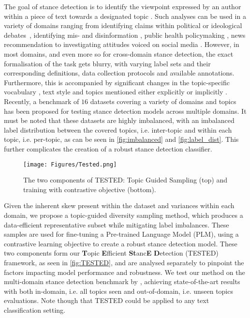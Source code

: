 \documentclass[11pt]{article}
\begin{document}
The goal of stance detection is to identify the viewpoint expressed by an author within a piece of text towards a designated topic \citep{mohammad2016semeval}. Such analyses can be used in a variety of domains ranging from identifying claims within political or ideological debates~\citep{somasundaran2010recognizing, thomas2006get}, identifying mis- and disinformation \citep{hanselowski2018retrospective,hardalov2021survey}, public health policymaking \citep{glandt2021stance,hossain2020covidlies, osnabrugge2023cross}, news recommendation \citep{reuver2021no} to investigating attitudes voiced on social media  \citep{qazvinian2011rumor,augenstein-etal-2016-stance,conforti2020will}. However, in most domains, and even more so for cross-domain stance detection, the exact formalisation of the task gets blurry, with varying label sets and their corresponding definitions, data collection protocols and available annotations. Furthermore, this is accompanied by significant changes in the topic-specific vocabulary \citep{somasundaran2010recognizing,wei2019modeling}, text style \citep{pomerleau2017fake, ferreira2016emergent} and topics mentioned either explicitly \citep{qazvinian2011rumor, walker2012corpus} or implicitly \citep{hasan2013stance,gorrell2019semeval}. Recently, a benchmark of $16$ datasets \citep{hardalov2021cross} covering a variety of domains and topics has been proposed for testing stance detection models across multiple domains. It must be noted that these datasets are highly imbalanced, with an imbalanced label distribution between the covered topics, i.e. inter-topic and within each topic, i.e. per-topic, as can be seen in \autoref{fig:imbalanced} and \autoref{fig:label_dist}. This further complicates the creation of a robust stance detection classifier.

\begin{figure}[t]
\centering
\texttt{[image: Figures/Tested.png]}
\caption{The two components of TESTED: Topic Guided Sampling (top) and training with contrastive objective (bottom).}
\label{fig:TESTED}
\end{figure}







Given the inherent skew present within the dataset and variances within each domain, we propose a topic-guided diversity sampling method, which produces a data-efficient representative subset while mitigating label imbalances. These samples are used for fine-tuning a Pre-trained Language Model (PLM), using a contrastive learning objective to create a robust stance detection model. These two components form our \textbf{T}opic \textbf{E}fficient \textbf{St}anc\textbf{E} \textbf{D}etection	(TESTED) framework, as seen in \autoref{fig:TESTED}, and are analysed separately to pinpoint the factors impacting model performance and robustness. We test our method on the multi-domain stance detection benchmark by \citet{hardalov2021cross}, achieving state-of-the-art results with both in-domain, i.e. all topics seen and out-of-domain, i.e. unseen topics evaluations. Note though that TESTED could be applied to any text classification setting.
\end{document}

